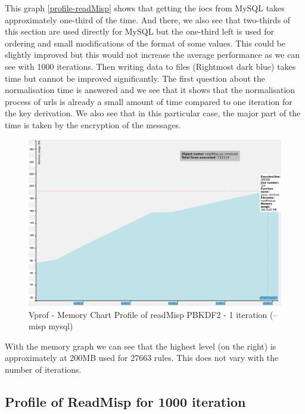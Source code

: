 \documentclass{eplmastersthesis}
\begin{document}
This graph \ref{profile-readMisp} shows that getting the \gls{ioc}s from MySQL takes approximately one-third of the time. And there, we also see that two-thirds of this section are used directly for MySQL but the one-third left is used for ordering and small modifications of the format of some values. This could be slightly improved but this would not increase the average performance as we can see with 1000 iterations.
Then writing data to files (Rightmost dark blue) takes time but cannot be improved significantly.
The first question about the normalisation time is answered and we see that it shows that the normalisation process of \gls{url}s is already a small amount of time compared to one iteration for the key derivation.
We also see that in this particular case, the major part of the time is taken by the encryption of the messages.\\

\begin{figure}[h!]
\begin{center}
	\includegraphics[scale=0.3]{res/profile-mem-readMisp-1iter}
	\caption{Vprof - Memory Chart Profile of readMisp PBKDF2 - 1 iteration (--misp mysql)}
	\label{profile-mem-readMisp}
\end{center}
\end{figure}

With the memory graph we can see that the highest level (on the right) is approximately at 200MB used for 27663 rules. This does not vary with the number of iterations.\\ 

\subsection{Profile of ReadMisp for 1000 iteration}
\end{document}
